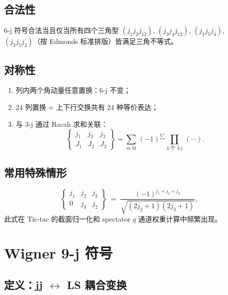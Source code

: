 \subsection{合法性}

6-j 符号合法当且仅当所有四个三角型 $(j_1 j_2 j_{12})$, $(j_3 j_4 j_{12})$,
$(j_1 j_5 j_4)$, $(j_3 j_5 j_2)$（按 Edmonds 标准排版）皆满足三角不等式。

\subsection{对称性}

\begin{enumerate}
\item 列内两个角动量任意置换：6-j 不变；
\item 24 列置换 + 上下行交换共有 24 种等价表达；
\item 与 3-j 通过 Racah 求和关联：
\begin{equation}
\begin{Bmatrix} j_1 & j_2 & j_3 \\ J_1 & J_2 & J_3 \end{Bmatrix}
=
\sum_{m\,M}\,
(-1)^{\sum} \prod_{\text{4 个 3-j}}\,(\cdots).
\end{equation}
\end{enumerate}

\subsection{常用特殊情形}

\begin{equation}
\begin{Bmatrix} j_1 & j_2 & j_3 \\ 0 & j_3 & j_2 \end{Bmatrix}
\;=\; \frac{(-1)^{j_1+j_2+j_3}}{\sqrt{(2 j_2+1)(2 j_3+1)}},
\end{equation}
此式在 Tic-tac 的截面归一化和 spectator $q$ 通道权重计算中频繁出现。

\section{Wigner 9-j 符号}
\label{sec:appB_9j}

\subsection{定义：jj $\leftrightarrow$ LS 耦合变换}

